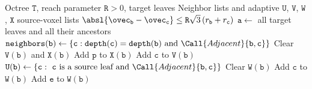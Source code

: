 \begin{algorithm}[h]
  \caption{Adjacency and adaptive interaction lists}
  \label{alg:interaction_lists}
  \begin{algorithmic}
    \Require Octree $\mathtt{T}$, reach parameter $\texttt{R} > 0$, target leaves
    \Ensure Neighbor lists and adaptive $\mathtt{U}$, $\mathtt{V}$, $\mathtt{W}$, $\mathtt{X}$ source-voxel lists
      \State \Return $\absl{\ovec_{\mathtt{b}}-\ovec_{\mathtt{c}}} \leq \mathtt{R}\sqrt{3}\,(r_{\mathtt{b}}+r_{\mathtt{c}})$
    \EndFunction
    \State $\mathtt{a}\gets$ all target leaves and all their ancestors
      \State $\mathtt{neighbors}(\mathtt{b})\gets\{\mathtt{c}:\mathtt{depth}(\mathtt{c})=\mathtt{depth}(\mathtt{b}) \text{ and } \Call{Adjacent}{\mathtt{b},\mathtt{c}}\}$
    \EndFor
        \State Clear $\mathtt{V}(\mathtt{b})$ and $\mathtt{X}(\mathtt{b})$
              \State Add $\mathtt{p}$ to $\mathtt{X}(\mathtt{b})$
            \EndIf
          \Else
                \State Add $\mathtt{c}$ to $\mathtt{V}(\mathtt{b})$
              \EndIf
            \EndFor
          \EndIf
        \EndFor
      \EndFor
    \EndFor
      \State $\mathtt{U}(\mathtt{b})\gets\{\mathtt{c}:\ \mathtt{c}\text{ is a source leaf and }\Call{Adjacent}{\mathtt{b},\mathtt{c}}\}$
      \State Clear $\mathtt{W}(\mathtt{b})$
        \State {}
      \EndFor
    \EndFor
          \State Add $\mathtt{c}$ to $\mathtt{W}(\mathtt{b})$
        \EndIf
        \State \Return
      \EndIf
          \State Add $\mathtt{e}$ to $\mathtt{W}(\mathtt{b})$
        \Else
          \State {}
        \EndIf
      \EndFor
    \EndFunction
  \end{algorithmic}
\end{algorithm}

